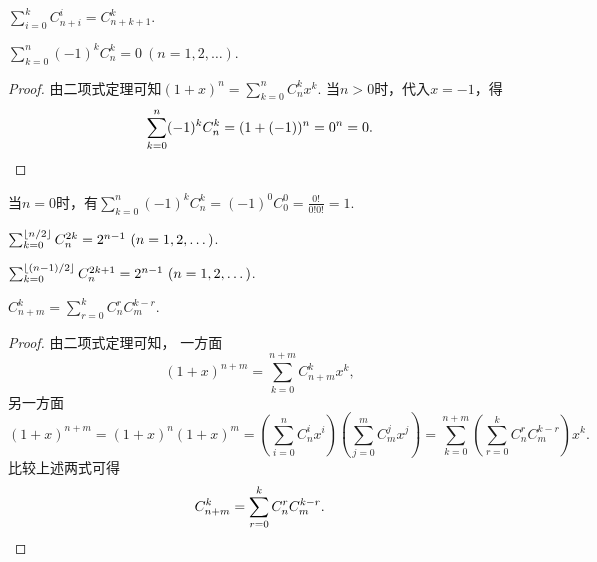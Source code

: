 \begin{property}
\(
	\sum_{i=0}^k C_{n+i}^i
	= C_{n+k+1}^k
\).
\end{property}

\begin{property}\label{theorem:组合数性质4}
\(\sum_{k=0}^n (-1)^k C_n^k = 0\ (n=1,2,\dotsc)\).
\begin{proof}
由二项式定理可知\(
	(1+x)^n
	= \sum_{k=0}^n C_n^k x^k
\).
当\(n>0\)时，代入\(x = -1\)，得\begin{equation*}
	\sum_{k=0}^n (-1)^k C_n^k
	= (1+(-1))^n
	= 0^n
	= 0.
	\qedhere
\end{equation*}
\end{proof}
\end{property}
\begin{remark}
当\(n=0\)时，有\(\sum_{k=0}^n (-1)^k C_n^k = (-1)^0 C_0^0 = \frac{0!}{0!0!} = 1\).
\end{remark}

\begin{property}\label{theorem:组合数性质5}
\(\sum_{k=0}^{\floor{n/2}} C_n^{2k} = 2^{n-1}\ (n=1,2,\dotsc)\).
\end{property}
\begin{property}\label{theorem:组合数性质6}
\(\sum_{k=0}^{\lfloor(n-1)/2\rfloor} C_n^{2k+1} = 2^{n-1}\ (n=1,2,\dotsc)\).
\end{property}

\begin{property}\label{theorem:组合数性质7}
\(C_{n+m}^k = \sum_{r=0}^k C_n^r C_m^{k-r}\).
\begin{proof}
由二项式定理可知，
一方面\begin{equation*}
	(1+x)^{n+m}
	= \sum_{k=0}^{n+m} C_{n+m}^k x^k,
\end{equation*}
另一方面\begin{equation*}
	(1+x)^{n+m}
	= (1+x)^n (1+x)^m
	= \left( \sum_{i=0}^n C_n^i x^i \right) \left( \sum_{j=0}^m C_m^j x^j \right)
	= \sum_{k=0}^{n+m} \left( \sum_{r=0}^k C_n^r C_m^{k-r} \right) x^k.
\end{equation*}
比较上述两式可得\begin{equation*}
	C_{n+m}^k = \sum_{r=0}^k C_n^r C_m^{k-r}.
	\qedhere
\end{equation*}
\end{proof}
\end{property}

